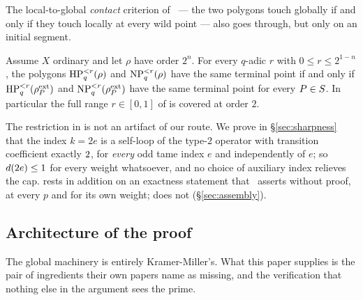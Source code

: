 The local-to-global \emph{contact} criterion of~\cite[Theorem~1.1]{kramermillerupton2021newton} --- the two polygons touch globally
if and only if they touch locally at every wild point --- also goes
through, but only on an initial segment.

\begin{theorem}
\label{thm:contact}
Assume $X$ ordinary and let $\rho$ have order $2^n$. For every $q$-adic $r$
with $0 \le r \le 2^{1-n}$, the polygons $\operatorname{HP}_q^{<r}(\rho)$ and
$\operatorname{NP}_q^{<r}(\rho)$ have the same terminal point if and only if
$\operatorname{HP}_q^{<r}(\rho_P^{\mathrm{ext}})$ and $\operatorname{NP}_q^{<r}(\rho_P^{\mathrm{ext}})$ have the same terminal point
for every $P \in S$. In particular the full range $r \in [0,1]$ of
\textup{\cite[Theorem~1.1]{kramermillerupton2021newton}} is covered at order $2$.
\end{theorem}

The restriction in  is not an artifact of our route. We
prove in \S\ref{sec:sharpness} that the index $k = 2e$ is a self-loop of the
type-$2$ operator with transition coefficient exactly $2$, for
\emph{every} odd tame index $e$ and independently of $e$; so $d(2e) \le
1$ for every weight whatsoever, and no choice of auxiliary index relieves
the cap.  rests in addition on an exactness statement that~\cite{kramermillerupton2021newton} asserts without proof, at every $p$ and for its own
weight;  does not (\S\ref{sec:assembly}).

\subsection{Architecture of the proof}
\label{sec:architecture}

The global machinery is entirely Kramer-Miller's. What this paper supplies
is the pair of ingredients their own papers name as missing, and the
verification that nothing else in the argument sees the prime.


